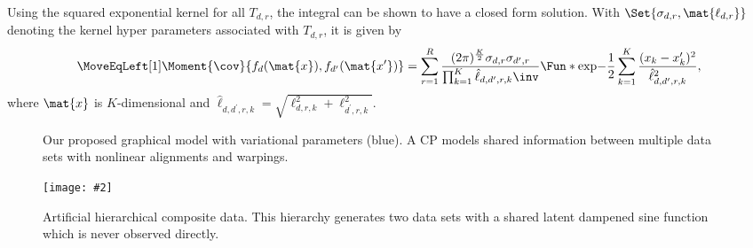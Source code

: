 \documentclass{article}
\newcommand{\includestandalonewithpath}[2][]{%
    \texttt{[image: \#2]}
}
\begin{document}
Using the squared exponential kernel for all $T_{d, r}$, the integral can be shown to have a closed form solution.
With $\Set{\sigma_{d,r}, \mat{\ell_{d, r}}}$ denoting the kernel hyper parameters associated with $T_{d,r}$, it is given by
\begin{align}
\label{eq:dependent_kernel}
\begin{split}
    \MoveEqLeft[1] \Moment{\cov}{f_d(\mat{x}), f_{d^\prime}(\mat{x^\prime})} = \sum_{r=1}^R \frac{(2\pi)^{\frac{K}{2}}\sigma_{d, r}\sigma_{d^\prime, r}}{\prod_{k=1}^K \hat{\ell}_{d, d^\prime, r, k}\inv} \Fun*{\exp}{-\frac{1}{2} \sum_{k=1}^K \frac{(x_k - x^\prime_k)^2}{\hat{\ell}_{d, d^\prime, r, k}^2}},
\end{split}
\end{align}
where $\mat{x}$ is $K$-dimensional and $\hat{\ell}_{d, d^\prime, r, k} = \sqrt{\ell_{d, r, k}^2 + \ell_{d^\prime, r, k}^2}$.
\begin{figure}[t]
    \centering
    \begin{minipage}[t]{.45\textwidth}
        \centering
        
        \caption{
            \label{fig:graphical_model_supervised}
            Our proposed graphical model with variational parameters (blue).
            A CP models shared information between multiple data sets with nonlinear alignments and warpings.
        }
    \end{minipage}
    \hfill
    \begin{minipage}[t]{.45\textwidth}
        \centering
        \includestandalonewithpath{figures/toy_decomposition_true}
        \caption{
            \label{fig:toy_decomposition}
            Artificial hierarchical composite data.
            This hierarchy generates two data sets with a shared latent dampened sine function which is never observed directly.
        }
    \end{minipage}
\end{figure}
\end{document}
